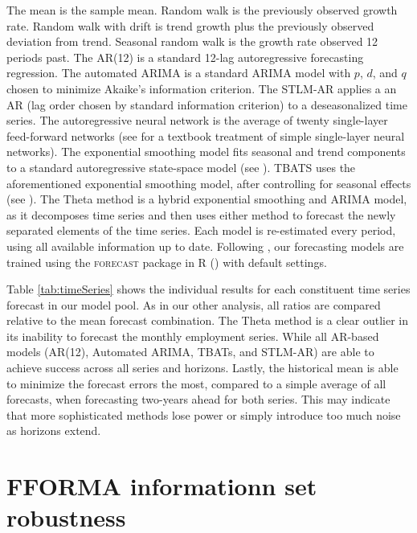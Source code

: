 \documentclass[12pt]{article}
\begin{document}
The mean is the sample mean. Random walk is the previously observed growth rate. Random walk with drift is trend growth plus the previously observed deviation from trend. Seasonal random walk is the growth rate observed 12 periods past. The AR(12) is a standard 12-lag autoregressive forecasting regression. The automated ARIMA is a standard ARIMA model with $p$, $d$, and $q$ chosen to minimize Akaike's information criterion. The STLM-AR  applies a an AR (lag order chosen by standard information criterion) to a deseasonalized time series.  The autoregressive neural network is the average of twenty single-layer feed-forward networks (see \cite{ElementsOfStatisticalLearning} for a textbook treatment of simple single-layer neural networks).
The exponential smoothing model fits seasonal and trend components to a standard autoregressive state-space model (see \cite{autoETS2002}). TBATS uses the aforementioned exponential smoothing model, after controlling for  seasonal effects (see \cite{tbats2008}). The Theta method is a hybrid exponential smoothing and ARIMA model, as it decomposes time series and then uses either method to forecast the newly separated elements of the time series. Each model is re-estimated every period, using all available information up to date. Following \citet{MMAHT2018}, our forecasting models are trained using the \textsc{forecast} package in R (\citet{forecastPackage}) with default settings.

Table \ref{tab:timeSeries} shows the individual results for each constituent time series forecast in our model pool. As in our other analysis, all ratios are compared relative to the mean forecast combination. The Theta method is a clear outlier in its inability to forecast the monthly employment series. While all AR-based models (AR(12), Automated ARIMA, TBATs, and STLM-AR) are able to achieve success across all series and horizons. Lastly, the historical mean is able to minimize the forecast errors the most, compared to a simple average of all forecasts, when forecasting two-years ahead for both series. This may indicate that more sophisticated methods lose power or simply introduce too much noise as horizons extend.   

\newpage
\section{FFORMA informationn set robustness}\label{app:FFORMAInfoSet}
\end{document}
